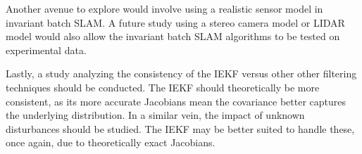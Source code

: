 Another avenue to explore would involve using a realistic sensor model in invariant batch SLAM. A future study using a stereo camera model or LIDAR model would also allow the invariant batch SLAM algorithms to be tested on experimental data.

Lastly, a study analyzing the consistency of the IEKF versus other other filtering techniques should be conducted. The IEKF should theoretically be more consistent, as its more accurate Jacobians mean the covariance better captures the underlying distribution. In a similar vein, the impact of unknown disturbances should be studied. The IEKF may be better suited to handle these, once again, due to theoretically exact Jacobians.